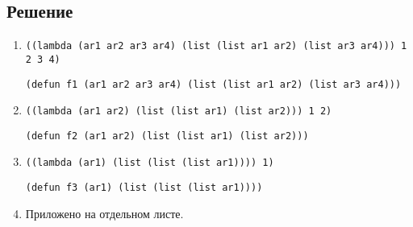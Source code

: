 \subsection{Решение}
\begin{enumerate}
	\item \texttt{((lambda (ar1 ar2 ar3 ar4) (list (list ar1 ar2) (list ar3 ar4))) 1 2 3 4)}
	
	\texttt{(defun f1 (ar1 ar2 ar3 ar4) (list (list ar1 ar2) (list ar3 ar4)))}
	
	\item \texttt{((lambda (ar1 ar2) (list (list ar1) (list ar2))) 1 2)}
	
	\texttt{(defun f2 (ar1 ar2) (list (list ar1) (list ar2)))}
	
	\item \texttt{((lambda (ar1) (list (list (list ar1)))) 1)}
	
	\texttt{(defun f3 (ar1) (list (list (list ar1))))}
	
	\item Приложено на отдельном листе.
\end{enumerate}

\newpage